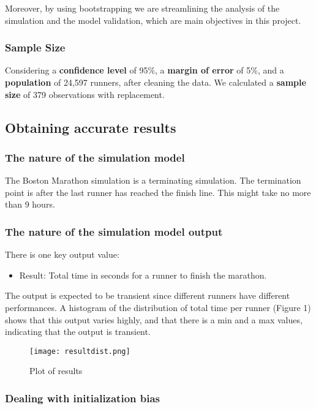 \documentclass[11pt, oneside]{article}   	%
\begin{document}
Moreover, by using bootstrapping we are streamlining the analysis of the simulation and the model validation, which are main objectives in this project.

\subsubsection{Sample Size}

Considering a \textbf{confidence level} of 95\%, a \textbf{margin of error} of 5\%, and a \textbf{population} of 24,597 runners, after cleaning the data. We calculated a \textbf{sample size} of 379 observations with replacement.


\subsection{Obtaining accurate results}

\subsubsection{The nature of the simulation model}

The Boston Marathon simulation is a terminating simulation. The termination point is after the last runner has reached the finish line. This might take no more than 9 hours.

\subsubsection{The nature of the simulation model output}

There is one key output value:

\begin{itemize}
\item Result: Total time in seconds for a runner to finish the marathon.
\end{itemize}

The output is expected to be transient since different runners have different performances. A histogram of the distribution of total time per runner (Figure 1) shows that this output varies highly, and that there is a min and a max values, indicating that the output is transient.

\begin{figure}[H]
\centering
  \texttt{[image: resultdist.png]}
  \caption{Plot of results}
  \label{fig:random1}
\end{figure}

\subsubsection{Dealing with initialization bias}
\end{document}
